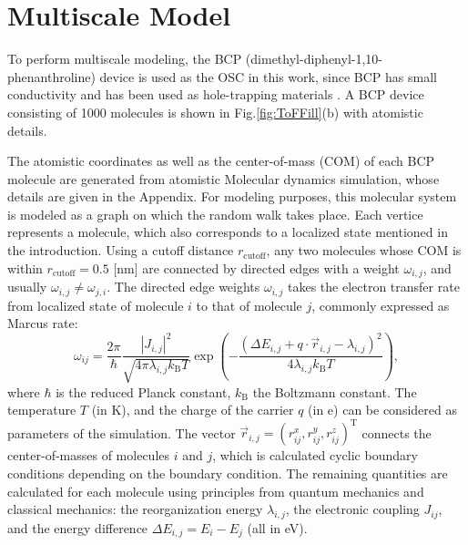 \documentclass[letterpaper,12pt]{article}
\begin{document}
\section{Multiscale Model}
\label{sec:MSM}
To perform multiscale modeling, the BCP (dimethyl-diphenyl-1,10-phenanthroline) device is used as the OSC in this work, since BCP has small conductivity and has been used as hole-trapping materials \cite{tsung_carrier_2008}.
A BCP device consisting of 1000 molecules is shown in Fig.\ref{fig:ToFFill}(b) with atomistic details.


The atomistic coordinates as well as the center-of-mass (COM) of each BCP molecule are generated from atomistic Molecular dynamics simulation, whose details are given in the Appendix.
For modeling purposes, this molecular system is modeled as a graph on which the random walk takes place. Each vertice represents a molecule, which also corresponds to a localized state mentioned in the introduction. 
Using a cutoff distance $r_\text{cutoff}$, any two molecules whose COM is within $r_\text{cutoff}=0.5$ [nm] are connected by directed edges with a weight $\omega_{i,j}$, and usually $\omega_{i,j} \neq \omega_{j,i}$.
The directed edge weights $\omega_{i,j}$ takes the electron transfer rate from localized state of molecule $i$ to that of molecule $j$, commonly expressed as Marcus rate:
%
\begin{equation}
    \omega_{ij} = \frac{2\pi}{\hbar} \frac{|J_{i,j}|^2}{\sqrt{4\pi \lambda_{i,j} k_\text{B}T}} \exp\left(-\frac{(\Delta E_{i,j} + q \cdot \vec{r}_{i,j} - \lambda_{i,j})^2}{4\lambda_{i,j} k_\text{B}T}\right) ,
    \label{equ:Marcus}
\end{equation}
%
where $\hbar$ is the reduced Planck constant, $k_\text{B}$ the Boltzmann constant. The temperature $T$ (in \unit[]{K}), and the charge of the carrier $q$ (in \unit[]{e}) can be considered as parameters of the simulation. The vector $\vec{r}_{i,j} = (r^x_{ij},r^y_{ij},r^z_{ij})^\text{T}$ connects the center-of-masses of molecules $i$ and $j$, which is calculated cyclic boundary conditions depending on the boundary condition.
The remaining quantities are calculated for each molecule using principles from quantum mechanics and classical mechanics: the reorganization energy $\lambda_{i,j}$, the electronic coupling $J_{ij}$, and the energy difference $\Delta E_{i,j} = E_i - E_j$ (all in \unit[]{eV}). 
\end{document}
